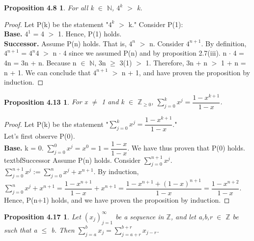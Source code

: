 \documentclass[12pt]{amsart}
\newcommand{\N}{\mathbb{N}}
\newcommand{\Z}{\mathbb{Z}}
\begin{document}
\newtheorem*{prop4.8}{Proposition 4.8}
\begin{prop4.8}
	For all k $\in$ $\N$, $4^k$ $>$ k.
\end{prop4.8}

\begin{proof}
	Let P(k) be the statement "$4^k$ $>$ k." Consider P(1):
	\\\textbf{Base.} $4^1$  = 4 $>$ 1. Hence, P(1) holds.
		\\\textbf{Successor.} Assume P(n) holds. That is, $4^n$ $>$ n. Consider $4^{n+1}$. By definition, $4^{n+1}$ = $4^{n}$4 $>$ n $\cdot$ 4 since we assumed P(n) and by proposition 2.7(iii). n $\cdot$ 4 = 4n = 3n + n. Because n $\in$ $\N$, 3n $\geq$ 3(1) $>$ 1. Therefore, 3n + n $>$ 1 + n = n + 1. We can conclude that $4^{n+1}$ $>$ n + 1, and have proven the proposition by induction.
\end{proof}

\newtheorem*{prop4.13}{Proposition 4.13}
\begin{prop4.13}
	For x $\neq$ 1 and k $\in$ $\Z_{\geq0}$, $\sum\limits_{j=0}^{k} x^{j} = \dfrac{1 - x^{k+1}}{1 - x}$.
\end{prop4.13}

\begin{proof}
	Let P(k) be the statement "$\sum\limits_{j=0}^{k} x^{j} = \dfrac{1 - x^{k+1}}{1 - x}$." \\Let's first observe P(0).
	\\\textbf{Base.} k = 0. $\sum\limits_{j=0}^{0} x^{j} = x^{0} = 1 = \dfrac{1 - x}{1 - x}$. We have thus proven that P(0) holds.
	\\textbf{Successor} Assume P(n) holds. Consider $\sum\limits_{j=0}^{n + 1} x^{j}$.\\ $\sum\limits_{j=0}^{n + 1} x^{j} :=  \sum\limits_{j=0}^{n} x^j + x^{n+1}$. By induction,\\ $\sum\limits_{j=0}^{n} x^j + x^{n+1} = \dfrac{1 - x^{n + 1}}{1 - x} + x^{n+1} = \dfrac{1 - x^{n + 1} + (1 - x)^{n+1}}{1 - x} = \dfrac{1 - x^{n+2}}{1-x}$. Hence, P(n+1) holds, and we have proven the proposition by induction.
\end{proof}

\newtheorem*{prop4.17}{Proposition 4.17}
\begin{prop4.17}
	Let $(x_j)_{j=1}^{\infty}$ be a sequence in $\Z$, and let a,b,r $\in$ $\Z$ be such that a $\leq$ b. Then $\sum\limits_{j=a}^{b} x_j = \sum\limits_{j=a+r}^{b+r} x_{j-r}$.
\end{prop4.17}
\end{document}
